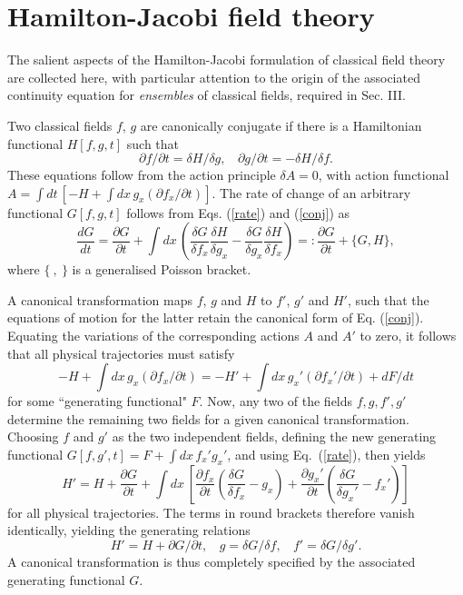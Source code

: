 \documentclass[a4paper,preprint, showpacs, aps, draft]{revtex4}
\begin{document}
{{\section{ Hamilton-Jacobi field theory}
The salient aspects of the Hamilton-Jacobi formulation of classical
field theory \cite{goldstein}
are collected here, with particular attention to the origin
of the associated continuity equation for {\it ensembles} of classical
fields, required in Sec. III.

Two classical fields $f$, $g$ are canonically conjugate if there is a
Hamiltonian functional $H[f,g,t]$ such that 
\begin{equation} \label{conj}
\partial f/\partial t = \delta H/\delta g, ~~~~\partial g/\partial t =
-\delta H/\delta f .
\end{equation}
These equations follow from the action principle $\delta A = 0$, with
action functional $A = \int dt\,[-H + \int dx\,g_x(\partial f_x/\partial
t)]$.  The rate of change of an arbitrary functional
$G[f,g,t]$ follows from Eqs. (\ref{rate}) and (\ref{conj}) as
\[
\frac{dG}{dt} = \frac{\partial G}{\partial t} + \int dx\,\left(
\frac{\delta G}{\delta f_x} \frac{\delta H}{\delta g_x} - \frac{\delta
G}{\delta g_x}\frac{\delta H}{\delta f_x} \right)
=: \frac{\partial G}{\partial
t} + \{ G,H\} , 
\]
where $\{~,~\}$ is a generalised Poisson bracket.

A canonical transformation maps $f$, $g$ and $H$ to $f'$, $g'$ and $H'$,
such that the equations of motion for the latter retain the canonical
form of Eq. (\ref{conj}).  Equating the variations of the corresponding
actions $A$ and $A'$ to zero, it follows that all physical trajectories
must satisfy
\[
-H + \int dx\, g_x(\partial f_x/\partial t) = -H' + \int dx\,g_x'(\partial
f_x'/\partial t) + dF/dt \]
for some ``generating functional" $F$.
Now, any two of the fields $f,g, f', g'$ determine the remaining two fields for
a given canonical transformation.  Choosing $f$ and $g'$ as the two
independent fields, defining the new generating functional $G[f,g',t] =
F + \int dx\, f_x'g_x'$, and using Eq.~(\ref{rate}), then yields 
\[
H' = H + \frac{\partial G}{\partial t} + \int dx\, \left[ \frac{\partial
f_x}{\partial t}\left( \frac{\delta G}{\delta f_x} -g_x\right) +
\frac{\partial g_x'}{\partial t}\left(\frac{\delta G}{\delta g_x'} -
f_x'\right)\right] \]
for all physical trajectories.  The terms in round brackets 
therefore vanish identically, yielding the generating relations
\begin{equation} \label{sgen}
H' = H + \partial G/\partial t,~~~~ g=\delta G/\delta
f,~~~~f'=\delta G/\delta g' .
\end{equation}
A canonical transformation is thus completely specified by the associated
generating functional $G$.

}}
\end{document}
